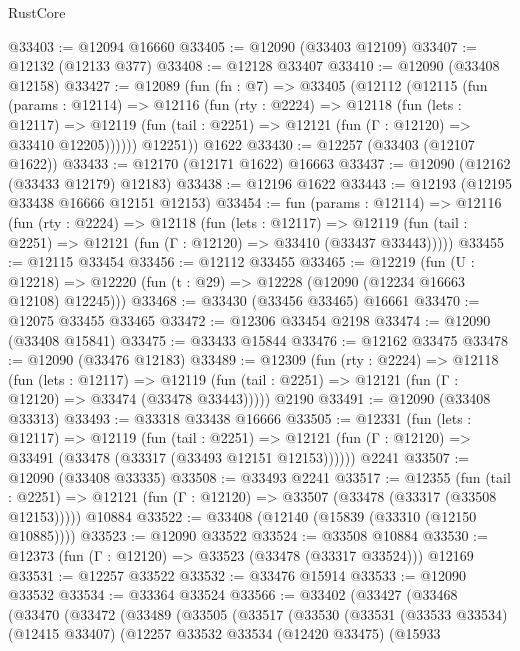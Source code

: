 \begin{lexlean}{RustCore}
\begin{coremodule}
@33403 := @12094 @16660
@33405 := @12090 (@33403 @12109)
@33407 := @12132 (@12133 @377)
@33408 := @12128 @33407
@33410 := @12090 (@33408 @12158)
@33427 := @12089
    (fun (fn : @7) =>
    @33405
      (@12112
        (@12115
          (fun (params : @12114) =>
          @12116
            (fun (rty : @2224) =>
            @12118
              (fun (lets : @12117) =>
              @12119 (fun (tail : @2251) => @12121 (fun (Γ : @12120) => @33410 @12205))))))
        @12251))
    @1622
@33430 := @12257 (@33403 (@12107 @1622))
@33433 := @12170 (@12171 @1622) @16663
@33437 := @12090 (@12162 (@33433 @12179) @12183)
@33438 := @12196 @1622
@33443 := @12193 (@12195 @33438 @16666 @12151 @12153)
@33454 := fun (params : @12114) =>
  @12116
    (fun (rty : @2224) =>
    @12118
      (fun (lets : @12117) =>
      @12119 (fun (tail : @2251) => @12121 (fun (Γ : @12120) => @33410 (@33437 @33443)))))
@33455 := @12115 @33454
@33456 := @12112 @33455
@33465 := @12219
    (fun (U : @12218) => @12220 (fun (t : @29) => @12228 (@12090 (@12234 @16663 @12108) @12245)))
@33468 := @33430 (@33456 @33465) @16661
@33470 := @12075 @33455 @33465
@33472 := @12306 @33454 @2198
@33474 := @12090 (@33408 @15841)
@33475 := @33433 @15844
@33476 := @12162 @33475
@33478 := @12090 (@33476 @12183)
@33489 := @12309
    (fun (rty : @2224) =>
    @12118
      (fun (lets : @12117) =>
      @12119 (fun (tail : @2251) => @12121 (fun (Γ : @12120) => @33474 (@33478 @33443)))))
    @2190
@33491 := @12090 (@33408 @33313)
@33493 := @33318 @33438 @16666
@33505 := @12331
    (fun (lets : @12117) =>
    @12119
      (fun (tail : @2251) =>
      @12121 (fun (Γ : @12120) => @33491 (@33478 (@33317 (@33493 @12151 @12153))))))
    @2241
@33507 := @12090 (@33408 @33335)
@33508 := @33493 @2241
@33517 := @12355
    (fun (tail : @2251) => @12121 (fun (Γ : @12120) => @33507 (@33478 (@33317 (@33508 @12153)))))
    @10884
@33522 := @33408 (@12140 (@15839 (@33310 (@12150 @10885))))
@33523 := @12090 @33522
@33524 := @33508 @10884
@33530 := @12373 (fun (Γ : @12120) => @33523 (@33478 (@33317 @33524))) @12169
@33531 := @12257 @33522
@33532 := @33476 @15914
@33533 := @12090 @33532
@33534 := @33364 @33524
@33566 := @33402
    (@33427
      (@33468
        (@33470
          (@33472
            (@33489
              (@33505
                (@33517
                  (@33530
                    (@33531
                      (@33533 @33534)
                      (@12415 @33407)
                      (@12257
                        @33532
                        @33534
                        (@12420 @33475)
                        (@15933

\end{coremodule}
\end{lexlean}
